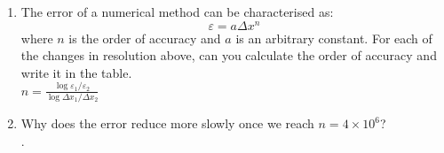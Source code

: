 \begin{enumerate}
\item The error of a numerical method can be characterised as:
\[\varepsilon = a \Delta x^n\]
where $n$ is the order of accuracy and $a$ is an arbitrary constant. For each of the changes in resolution above, can you calculate the order of accuracy and write it in the table. \\
\optparagraph
{
    $n = \frac{\log \varepsilon_1/\varepsilon_2}{\log \Delta x_1/\Delta x_2}$
}

\item Why does the error reduce more slowly once we reach $n=4\times 10^6$?\\
.


\end{enumerate}
